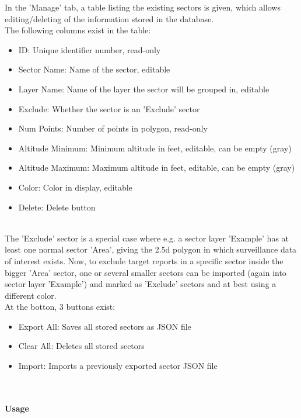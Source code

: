 In the 'Manage' tab, a table listing the existing sectors is given, which allows editing/deleting of the information stored in the database. \\

The following columns exist in the table:
\begin{itemize}
\item ID: Unique identifier number, read-only
\item Sector Name: Name of the sector, editable
\item Layer Name: Name of the layer the sector will be grouped in, editable
\item Exclude: Whether the sector is an 'Exclude' sector
\item Num Points: Number of points in polygon, read-only
\item Altitude Minimum: Minimum altitude in feet, editable, can be empty (gray)
\item Altitude Maximum: Maximum altitude in feet, editable, can be empty (gray)
\item Color: Color in display, editable
\item Delete: Delete button
\end{itemize}
\ \\

The 'Exclude' sector is a special case where e.g. a sector layer 'Example' has at least one normal sector 'Area', giving the 2.5d polygon in which surveillance data of interest exists. 
Now, to exclude target reports in a specific sector inside the bigger 'Area' sector, 
one or several smaller sectors can be imported (again into sector layer 'Example') and marked as 'Exclude' sectors and at best using a different color. \\

At the botton, 3 buttons exist:

\begin{itemize}
\item Export All: Saves all stored sectors as JSON file
\item Clear All: Deletes all stored sectors
\item Import: Imports a previously exported sector JSON file
\end{itemize}
\ \\

\paragraph {Usage}

